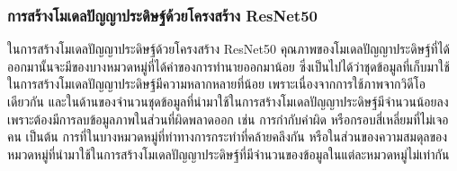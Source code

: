 \subsubsection{การสร้างโมเดลปัญญาประดิษฐ์ด้วยโครงสร้าง ResNet50}
\par
ในการสร้างโมเดลปัญญาประดิษฐ์ด้วยโครงสร้าง ResNet50 คุณภาพของโมเดลปัญญาประดิษฐ์ที่ได้ออกมานั้นจะมีของบางหมวดหมู่ที่ได้ค่าของการทำนายออกมาน้อย ซึ่งเป็นไปได้ว่าชุดข้อมูลที่เก็บมาใช้ในการสร้างโมเดลปัญญาประดิษฐ์มีความหลากหลายที่น้อย เพราะเนื่องจากการใช้ภาพจากวิดีโอเดียวกัน และในด้านของจำนวนชุดข้อมูลที่นำมาใช้ในการสร้างโมเดลปัญญาประดิษฐ์มีจำนวนน้อยลง เพราะต้องมีการลบข้อมูลภาพในส่วนที่ผิดพลาดออก เช่น การกำกับคำผิด หรือกรอบสี่เหลี่ยมที่ไม่เจอคน เป็นต้น การที่ในบางหมวดหมู่ที่ท่าทางการกระทำที่คล้ายคลึงกัน หรือในส่วนของความสมดุลของหมวดหมู่ที่นำมาใช้ในการสร้างโมเดลปัญญาประดิษฐ์ที่มีจำนวนของข้อมูลในแต่ละหมวดหมู่ไม่เท่ากัน
